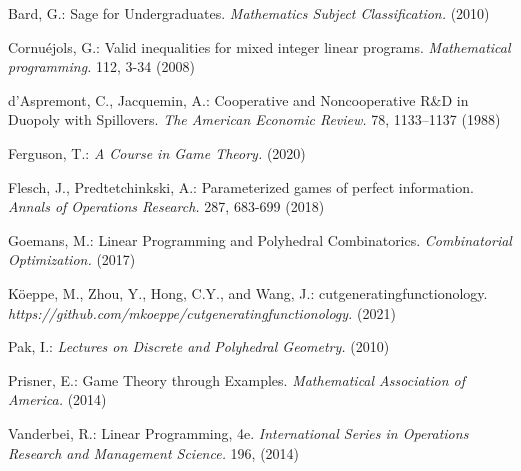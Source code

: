 \documentclass{article}
\begin{document}
\pagebreak
{}
\begin{thebibliography}{1}
\smallskip

\bibitem {}
Bard, G.:
Sage for Undergraduates.
{\it Mathematics Subject Classification.} (2010)

\bibitem {}
Cornu\'ejols, G.:
Valid inequalities for mixed integer linear programs.
{\it Mathematical programming.} 112, 3-34 (2008)

\bibitem {}
d'Aspremont, C., Jacquemin, A.:
Cooperative and Noncooperative R\&D in Duopoly with Spillovers.
{\it The American Economic Review.} 78, 1133--1137 (1988)

\bibitem {}
Ferguson, T.:
{\it A Course in Game Theory.} (2020)

\bibitem {}
Flesch, J., Predtetchinkski, A.:
Parameterized games of perfect information.
{\it Annals of Operations Research.} 287, 683-699 (2018)

\bibitem {}
Goemans, M.:
Linear Programming and Polyhedral Combinatorics.
{\it Combinatorial Optimization.} (2017)

\bibitem{}
K\"{o}eppe, M., Zhou, Y., Hong, C.Y., and Wang, J.:
cutgeneratingfunctionology.
{\it https://github.com/mkoeppe/cutgeneratingfunctionology.} (2021)

\bibitem {}
Pak, I.:
{\it Lectures on Discrete and Polyhedral Geometry.} (2010)

\bibitem {}
Prisner, E.:
Game Theory through Examples.
{\it Mathematical Association of America.} (2014)

\bibitem {}
Vanderbei, R.:
Linear Programming, 4e.
{\it International Series in Operations Research and Management Science.} 196, (2014)







\end{thebibliography}
\end{document}
